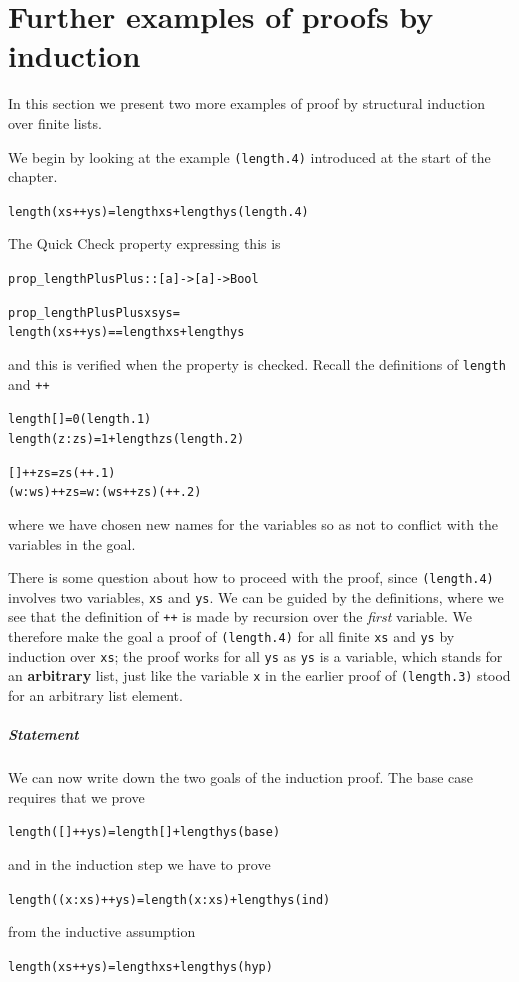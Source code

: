 \section{Further examples of proofs by induction}
\label{furtherIndPrfs}
In this section we present two more examples of proof by structural induction
over finite lists.
\begin{example}
\minx{++}
We begin by looking at the example \texttt{(length.4)} introduced
at the start of the chapter.
\begin{alltt}
length (xs ++ ys) = length xs + length ys\hfill(length.4) 
\end{alltt}
The Quick Check property expressing this is 
\begin{alltt}
prop_lengthPlusPlus :: [a] -> [a] -> Bool

prop_lengthPlusPlus xs ys =
    length (xs ++ ys) == length xs + length ys
\end{alltt}
and this is verified when the property is checked.
Recall the definitions of \texttt{length} and \texttt{++}
\begin{alltt}
length []     = 0\hfill(length.1)
length (z:zs) = 1 + length zs\hfill(length.2)
 
[]     ++ zs = zs\hfill(++.1)
(w:ws) ++ zs = w:(ws++zs)\hfill(++.2)
\end{alltt}
where we have chosen new names for the variables so as not to conflict
with the variables in the goal.

There is some question about how to proceed with the proof, since
\texttt{(length.4)} involves two variables, \texttt{xs} and \texttt{ys}.
We can be guided by the definitions, where we see that the definition
of \texttt{++} is made by recursion over the {\em first\/} variable. We
therefore make the goal a proof of \texttt{(length.4)} for all finite
\texttt{xs} and \texttt{ys} by induction over \texttt{xs}; the proof
works for all \texttt{ys} as \texttt{ys} is a variable, which stands for
an \textbf{arbitrary} list, just like the variable \texttt{x} in the earlier proof of
\texttt{(length.3)} stood for an arbitrary list element.
\subparagraph*{Statement} We can now write down the two goals of the induction
proof. The base case requires that we prove
\begin{alltt}
length ([] ++ ys) = length [] + length ys\hfill(base) 
\end{alltt}
and in the induction step we have to prove
\begin{alltt}
length ((x:xs) ++ ys) = length (x:xs) + length ys\hfill(ind) 
\end{alltt}
from the inductive assumption
\begin{alltt}
length (xs ++ ys) = length xs + length ys\hfill(hyp) 
\end{alltt}


\end{example}
